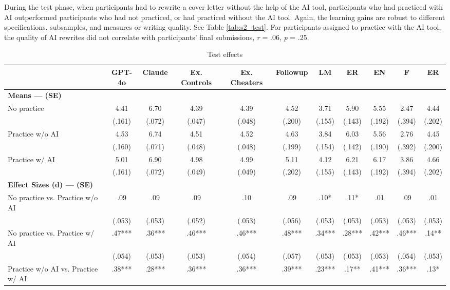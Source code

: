 \documentclass[11pt]{report}
\begin{document}
\begin{append}
During the test phase, when participants had to rewrite a cover letter without the help of the AI tool, participants who had practiced with AI outperformed participants who had not practiced, or had practiced without the AI tool. Again, the learning gains are robust to different specifications, subsamples, and measures or writing quality. See Table \ref{tab:s2_test}.
For participants assigned to practice with the AI tool, the quality of AI rewrites did not correlate with participants' final submissions, \textit{r} = .06, \textit{p} = .25.

\begin{table}[ht]
    \centering
    \caption{Test effects}
\begin{tabular}{lcccccccccc}
\toprule
  & GPT-4o & Claude & Ex. Controls & Ex. Cheaters & Followup & LM & ER & EN & F & ER \\ 
\midrule
\multicolumn{11}{l}{\textbf{Means --- (SE)}} \\ 
\midrule
No practice & 4.41 & 6.70 & 4.39 & 4.39 & 4.52 & 3.71 & 5.90 & 5.55 & 2.47 & 4.44 \\ 
 & (.161) & (.072) & (.047) & (.048) & (.200) & (.155) & (.143) & (.192) & (.394) & (.202) \\ 
Practice w/o AI & 4.53 & 6.74 & 4.51 & 4.52 & 4.63 & 3.84 & 6.03 & 5.56 & 2.76 & 4.45 \\ 
 & (.160) & (.071) & (.048) & (.048) & (.199) & (.154) & (.142) & (.190) & (.392) & (.200) \\ 
Practice w/ AI & 5.01 & 6.90 & 4.98 & 4.99 & 5.11 & 4.12 & 6.21 & 6.17 & 3.86 & 4.66 \\ 
 & (.161) & (.072) & (.049) & (.049) & (.202) & (.155) & (.143) & (.192) & (.394) & (.202) \\ 
\midrule
\multicolumn{11}{l}{\textbf{Effect Sizes (d) --- (SE)}} \\ 
\midrule
No practice vs. Practice w/o AI & .09 & .09 & .09 & .10 & .09 & .10* & .11* & .01 & .09 & .01 \\ 
 & (.053) & (.053) & (.052) & (.053) & (.056) & (.053) & (.053) & (.053) & (.053) & (.053) \\ 
No practice vs. Practice w/ AI & .47*** & .36*** & .46*** & .46*** & .48*** & .34*** & .28*** & .42*** & .46*** & .14** \\ 
 & (.054) & (.053) & (.053) & (.054) & (.057) & (.053) & (.053) & (.053) & (.054) & (.053) \\ 
Practice w/o AI vs. Practice w/ AI & .38*** & .28*** & .36*** & .36*** & .39*** & .23*** & .17** & .41*** & .36*** & .13* \\ 

\end{tabular}
\end{table}
\end{append}
\end{document}
